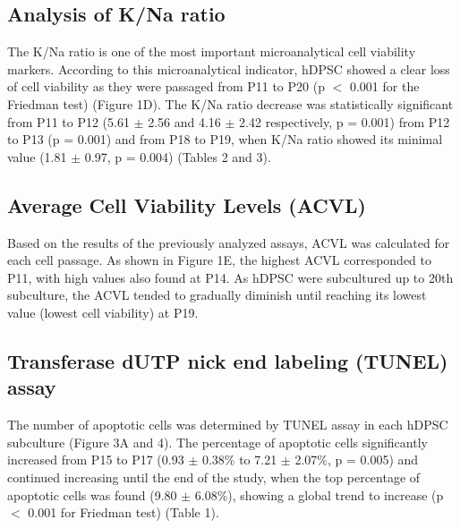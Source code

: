 \documentclass[a4paper,twocolumn,12pt]{article}
\begin{document}
\subsection{Analysis of K/Na ratio}
The K/Na ratio is one of the most important microanalytical cell viability markers. According to this microanalytical indicator, hDPSC showed a clear loss of cell viability as they were passaged from P11 to P20 (p $<$ 0.001 for the Friedman test) (Figure 1D). The K/Na ratio decrease was statistically significant from P11 to P12 (5.61 $\pm$ 2.56 and 4.16 $\pm$ 2.42 respectively, p = 0.001) from P12 to P13 (p = 0.001) and from P18 to P19, when K/Na ratio showed its minimal value (1.81 $\pm$ 0.97, p = 0.004) (Tables 2 and 3).

\subsection{Average Cell Viability Levels (ACVL)}
Based on the results of the previously analyzed assays, ACVL was calculated for each cell passage. As shown in Figure 1E, the highest ACVL corresponded to P11, with high values also found at P14. As hDPSC were subcultured up to 20th subculture, the ACVL tended to gradually diminish until reaching its lowest value (lowest cell viability) at P19.

\subsection{Transferase dUTP nick end labeling (TUNEL) assay}
The number of apoptotic cells was determined by TUNEL assay in each hDPSC subculture (Figure 3A and 4). The percentage of apoptotic cells significantly increased from P15 to P17 (0.93 $\pm$ 0.38\% to 7.21 $\pm$ 2.07\%, p = 0.005) and continued increasing until the end of the study, when the top percentage of apoptotic cells was found (9.80 $\pm$ 6.08\%), showing a global trend to increase (p $<$ 0.001 for Friedman test) (Table 1).
\end{document}
